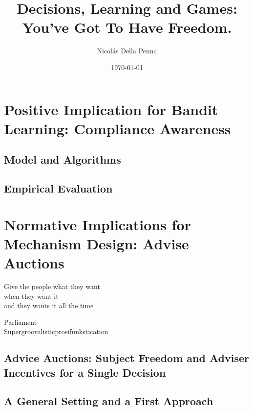\documentclass[11pt, a4paper]{book}
\title{Decisions, Learning and Games: \\ You've Got To Have Freedom.}
\author{Nicol\'as Della Penna}
\date{\today}
\begin{document}
\pagestyle{empty}
\thispagestyle{empty}



\cleardoublepage
\pagestyle{empty}


\cleardoublepage
\pagestyle{empty}


\cleardoublepage
\pagestyle{headings}


\cleardoublepage
\pagestyle{headings}
\tableofcontents
\listoffigures
\listoftables

\mainmatter




\part{Positive Implication for Bandit Learning: Compliance Awareness}

\chapter{Model and Algorithms} \label{cha:bandit}





\chapter{Empirical Evaluation} \label{cha:empirical}



\part{Normative Implications for Mechanism Design: Advise Auctions}


\epigraph{Give the people what they want\\ when they want it \\
and they wants it all the time}{Parliament \\ Supergroovalisticprosifunkstication}

\chapter{Advice Auctions: Subject Freedom and Adviser Incentives for a Single Decision} \label{cha:market}


\chapter{A General Setting and a First Approach} \label{cha:twosided}

\end{document}
